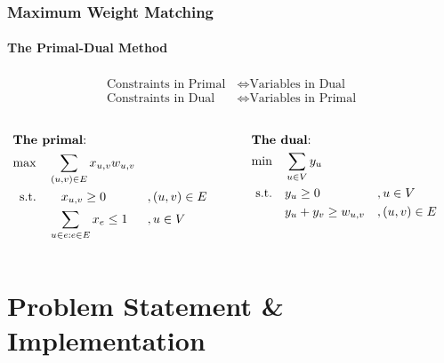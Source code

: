 \documentclass[hyperref={pdfpagelabels=false}]{beamer}
\begin{document}
\begin{frame} \frametitle{Maximum Weight Matching}\framesubtitle{The Primal-Dual Method}

\begin{block}{}
\vspace{-0.4cm}
\begin{align*}
\begin{split}
\text{Constraints in Primal}&\Longleftrightarrow \text{Variables in Dual}\\
\text{Constraints in Dual}\quad &\Longleftrightarrow \text{Variables in Primal}
\end{split}
\end{align*}
\end{block}
\vspace{0.4cm}
\begin{columns}
\begin{column}[t]{0.49\textwidth}
\vspace{-1.5cm}
\begin{align*}
\intertext{\textbf{The primal}:}
\max&\quad \sum_{(u,v) \in E} x_{u,v} w_{u,v}\\
\text{s.t.} &\qquad x_{u,v}\geq 0 &&, (u,v) \in E \\
	&\quad \sum_{u \in e: e\in E} x_e \leq 1 &&, u \in V
\end{align*}\end{column}
\begin{column}[t]{0.49\textwidth}
\vspace{-1.5cm}
\begin{align*}
\intertext{\textbf{The dual}:}
\min&\quad \sum_{u \in V} y_u\\
\text{s.t.} &\quad y_u\geq 0 &&, u \in V\\
	&\quad y_u+y_v \geq w_{u,v} &&,(u,v) \in E
\end{align*}
\end{column}
\end{columns}
\end{frame}

\section{Problem Statement \& Implementation}
\begin{frame}
  \tableofcontents[currentsection]
\end{frame}
 
\end{document}
